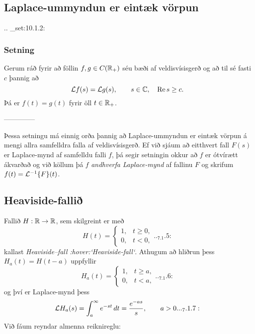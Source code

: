 \subsection*{Laplace-ummyndun er eintæk vörpun}



.. _set:10.1.2:

\subsubsection{Setning}
Gerum ráð fyrir að föllin $f,g\in C({\mathbb R}_+)$ séu bæði af
veldisvísisgerð og að til sé fasti $c$ þannig að 
 $${\cal L} f(s)={\cal L} g(s), \qquad s\in {\mathbb C}, \quad {\operatorname{Re\, }} s\geq c.
 $$
Þá er $f(t)=g(t)$ fyrir öll $t\in {\mathbb R}_+$. 


--------------




Þessa setningu má einnig orða þannig að Laplace-ummyndun er eintæk
vörpun á mengi allra samfelldra falla af veldisvísisgerð.  
Ef við sjáum að eitthvert fall $F(s)$ er Laplace-mynd af samfelldu 
falli $f$, 
þá segir setningin okkur að $f$ er ótvírætt ákvarðað og við köllum þá
$f$ {\it andhverfa Laplace-mynd } af fallinu $F$ og skrifum
$f(t)={\cal L}^{-1}\{F\}(t)$.


\subsection*{Heaviside-fallið}

Fallið $H:{\mathbb R}\to {\mathbb R}$, sem skilgreint er með
\begin{equation*}
H(t)=\begin{cases} 1, &t\geq 0,\\ 0, & t<0,\end{cases}

.. _7.1.5:

\end{equation*}
kallast {\it Heaviside--fall :hover:`Heaviside-fall`}.  Athugum að
hliðrun þess $H_a(t)=H(t-a)$ uppfyllir
\begin{equation*}
H_a(t)=\begin{cases} 1, &t\geq a,\\ 0, & t<a,\end{cases}

.. _7.1.6:

\end{equation*}
og því er Laplace-mynd þess
\begin{equation*}
\L H_a(s)= \int_a^{\infty} e^{-st}\, dt= \dfrac{e^{-as}} s, \qquad a>0.


.. _7.1.7:

\end{equation*}
Við fáum reyndar almenna reiknireglu:

